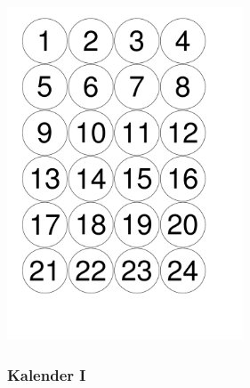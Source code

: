 \documentclass[14pt,ngerman]{beamer}
\begin{document}
\begin{frame}

\begin{center}
\includegraphics[width=7cm]{./Examples/Weihnachtszahlen-3}
\end{center}
\end{frame}

\begin{frame}[containsverbatim]
\frametitle{Kalender I}

\begin{center}
\end{center}
\end{frame}
\end{document}
